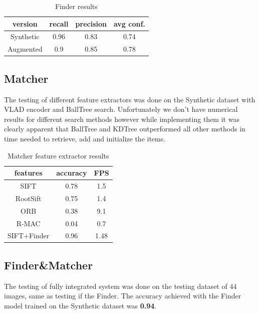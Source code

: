 \documentclass{article}
\begin{document}
\begin{table}[H]
    \centering
    \begin{tabular}{ c|c c c } 
     version & recall & precision & avg conf. \\ \hline
     Synthetic & 0.96 & 0.83 & 0.74 \\ 
     Augmented & 0.9 & 0.85 &  0.78 \\ 
    \end{tabular}
    \caption{Finder results}
\end{table}

\subsection{Matcher}

The testing of different feature extractors was done on the Synthetic dataset with VLAD encoder and BallTree search.
Unfortunately we don't have numerical results for different search methods however while implementing them it was clearly apparent that BallTree and KDTree outperformed all other methods in time needed to retrieve, add and initialize the items.

\begin{table}[H]
    \centering
    \begin{tabular}{ c|c c  } 
    features & accuracy & FPS \\ \hline \hline
    SIFT     & 0.78     & 1.5 \\ 
    RootSift & 0.75     & 1.4 \\ 
    ORB      & 0.38     & 9.1 \\
    R-MAC    & 0.04     & 0.7 \\ \hline
    SIFT+Finder & 0.96 & 1.48 \\
    \end{tabular}
    \caption{Matcher feature extractor results}
\end{table}

\subsection{Finder\&Matcher}

The testing of fully integrated system was done on the testing dataset of 44 images, same as testing if the Finder.
The accuracy achieved with the Finder model trained on the Synthetic dataset was \textbf{0.94}.
\end{document}

